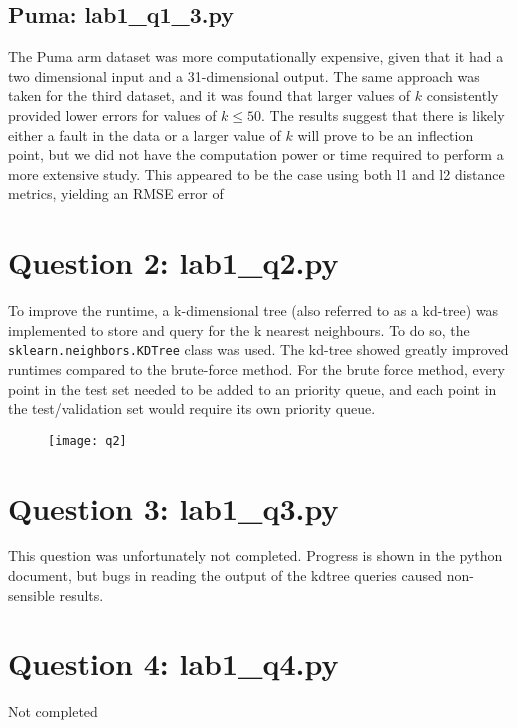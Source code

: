 \documentclass{article}
\begin{document}
\subsection{Puma: lab1\_q1\_3.py}
The Puma arm dataset was more computationally expensive, given that it had a two dimensional input and a 31-dimensional output. The same approach was taken for the third dataset, and it was found that larger values of $k$ consistently provided lower errors for values of $k \leq 50$. The results suggest that there is likely either a fault in the data or a larger value of $k$ will prove to be an inflection point, but we did not have the computation power or time required to perform a more extensive study. This appeared to be the case using both l1 and l2 distance metrics, yielding an RMSE error of 

\section{Question 2: lab1\_q2.py}
To improve the runtime, a k-dimensional tree (also referred to as a kd-tree) was implemented to store and query for the k nearest neighbours. To do so, the \texttt{sklearn.neighbors.KDTree} class was used. The kd-tree showed greatly improved runtimes compared to the brute-force method. For the brute force method, every point in the test set needed to be added to an priority queue, and each point in the test/validation set would require its own priority queue.

\begin{figure} [h !]
\texttt{[image: q2]}
\centering
\end{figure}


\section{Question 3: lab1\_q3.py}
This question was unfortunately not completed. Progress is shown in the python document, but bugs in reading the output of the kdtree queries caused non-sensible results.

\section{Question 4: lab1\_q4.py}
Not completed
\end{document}
